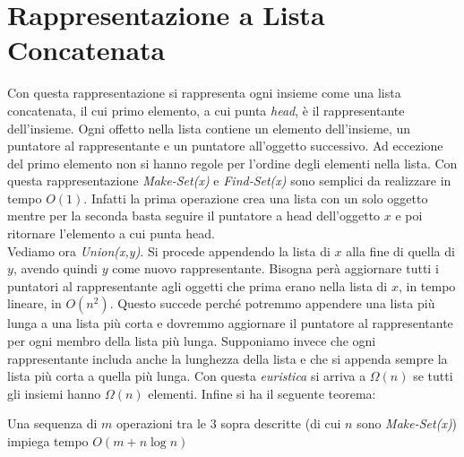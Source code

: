 \documentclass[a4paper,12pt, oneside]{book}
\begin{document}
\section{Rappresentazione a Lista Concatenata}
Con questa rappresentazione si rappresenta ogni insieme come una lista
concatenata, il cui primo elemento, a cui punta \textit{head},
è il rappresentante dell'insieme. Ogni offetto nella lista contiene
un elemento dell'insieme, un puntatore al rappresentante
e un puntatore all'oggetto successivo. Ad eccezione del primo
elemento non si hanno regole per l'ordine degli
elementi nella lista. Con questa rappresentazione
\textit{Make-Set(x)} e \textit{Find-Set(x)} sono semplici da
realizzare in tempo $O(1)$. Infatti la prima operazione crea una
lista con un solo oggetto mentre per la seconda basta seguire il
puntatore a head dell’oggetto $x$ e poi ritornare l’elemento a cui
punta head. \\
Vediamo ora \textit{Union(x,y)}. Si procede appendendo la lista di $x$
alla fine di quella di $y$, avendo quindi $y$ come nuovo
rappresentante. Bisogna perà aggiornare tutti i puntatori al
rappresentante agli oggetti che prima erano nella lista di $x$, in
tempo lineare, in $O(n^2)$. Questo succede perché potremmo appendere
una lista più lunga a una lista più corta e dovremmo aggiornare
il puntatore al rappresentante per ogni membro
della lista più lunga. Supponiamo invece che ogni rappresentante
includa anche la lunghezza della lista e che si appenda sempre la
lista più corta a quella più lunga. Con questa \textit{euristica} si
arriva a $\Omega(n)$ se tutti gli insiemi hanno $\Omega(n)$
elementi. Infine si ha il seguente teorema:
\begin{teorema}
  Una sequenza di $m$ operazioni tra le 3 sopra descritte (di cui $n$
  sono \textit{Make-Set(x)}) impiega tempo $O(m+n\log n)$
\end{teorema}
\end{document}
